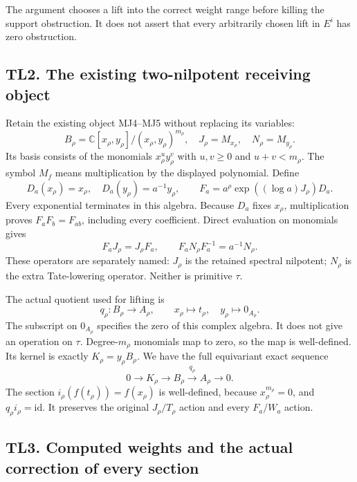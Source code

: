 The argument chooses a lift into the correct weight range before killing
the support obstruction. It does not assert that every arbitrarily
chosen lift in \(E^i\) has zero obstruction.

\subsection{TL2. The existing two-nilpotent receiving
object}\label{tl2.-the-existing-two-nilpotent-receiving-object}

Retain the existing object MJ4--MJ5 without replacing its variables: \[
B_\rho=\mathbb C[x_\rho,y_\rho]/(x_\rho,y_\rho)^{m_\rho},
\quad J_\rho=M_{x_\rho},\quad N_\rho=M_{y_\rho}.
\] Its basis consists of the monomials \(x_\rho^u y_\rho^v\) with
\(u,v\ge0\) and \(u+v<m_\rho\). The symbol \(M_f\) means multiplication
by the displayed polynomial. Define \[
D_a(x_\rho)=x_\rho,\quad D_a(y_\rho)=a^{-1}y_\rho,\qquad
F_a=a^\rho\exp((\log a)J_\rho)D_a.
\tag{TL2.1}
\] Every exponential terminates in this algebra. Because \(D_a\) fixes
\(x_\rho\), multiplication proves \(F_aF_b=F_{ab}\), including every
coefficient. Direct evaluation on monomials gives \[
F_aJ_\rho=J_\rho F_a,\qquad
F_aN_\rho F_a^{-1}=a^{-1}N_\rho.
\tag{TL2.2}
\] These operators are separately named: \(J_\rho\) is the retained
spectral nilpotent; \(N_\rho\) is the extra Tate-lowering operator.
Neither is primitive \(\tau\).

The actual quotient used for lifting is \[
q_\rho:B_\rho\longrightarrow A_\rho,\qquad
x_\rho\longmapsto t_\rho,\quad y_\rho\longmapsto0_{A_\rho}.
\tag{TL2.3}
\] The subscript on \(0_{A_\rho}\) specifies the zero of this complex
algebra. It does not give an operation on \(\tau\). Degree-\(m_\rho\)
monomials map to zero, so the map is well-defined. Its kernel is exactly
\(K_\rho=y_\rho B_\rho\). We have the full equivariant exact sequence \[
0\longrightarrow K_\rho\longrightarrow B_\rho
\xrightarrow{q_\rho}A_\rho\longrightarrow0.
\tag{TL2.4}
\] The section \(i_\rho(f(t_\rho))=f(x_\rho)\) is well-defined, because
\(x_\rho^{m_\rho}=0\), and \(q_\rho i_\rho=\mathrm{id}\). It preserves
the original \(J_\rho/T_\rho\) action and every \(F_a/W_a\) action.

\subsection{TL3. Computed weights and the actual correction of every
section}\label{tl3.-computed-weights-and-the-actual-correction-of-every-section}

